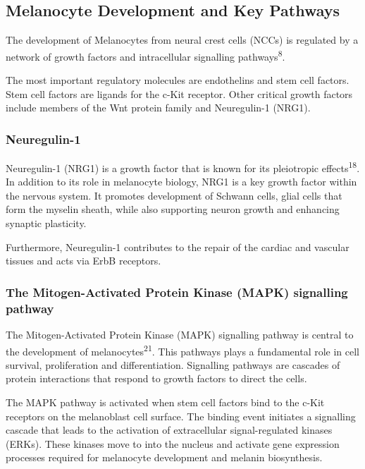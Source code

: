 \documentclass[
]{article}
\begin{document}
\subsection{Melanocyte Development and Key
Pathways}\label{melanocyte-development-and-key-pathways}

The development of Melanocytes from neural crest cells (NCCs) is
regulated by a network of growth factors and intracellular signalling
pathways\textsuperscript{8}.

The most important regulatory molecules are endothelins and stem cell
factors. Stem cell factors are ligands for the c-Kit receptor. Other
critical growth factors include members of the Wnt protein family and
Neuregulin-1 (NRG1).

\subsubsection{Neuregulin-1}\label{neuregulin-1}

Neuregulin-1 (NRG1) is a growth factor that is known for its pleiotropic
effects\textsuperscript{18}. In addition to its role in melanocyte
biology, NRG1 is a key growth factor within the nervous system. It
promotes development of Schwann cells, glial cells that form the myselin
sheath, while also supporting neuron growth and enhancing synaptic
plasticity.

Furthermore, Neuregulin-1 contributes to the repair of the cardiac and
vascular tissues and acts via ErbB receptors.

\subsubsection{The Mitogen-Activated Protein Kinase (MAPK) signalling
pathway}\label{the-mitogen-activated-protein-kinase-mapk-signalling-pathway}

The Mitogen-Activated Protein Kinase (MAPK) signalling pathway is
central to the development of melanocytes\textsuperscript{21}. This
pathways plays a fundamental role in cell survival, proliferation and
differentiation. Signalling pathways are cascades of protein
interactions that respond to growth factors to direct the cells.

The MAPK pathway is activated when stem cell factors bind to the c-Kit
receptors on the melanoblast cell surface. The binding event initiates a
signalling cascade that leads to the activation of extracellular
signal-regulated kinases (ERKs). These kinases move to into the nucleus
and activate gene expression processes required for melanocyte
development and melanin biosynthesis.
\end{document}
